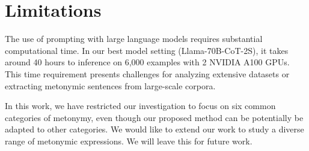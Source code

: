 \documentclass[11pt]{article}
\begin{document}
\begin{table}[t]
    \centering
\caption{Increase in F1-score on metonymic examples using majority vote. The values in parentheses indicate the increase in F1-score for metonymic examples compared to the single-run baseline.}
\label{table:ensemble_basic_cot}
\end{table}

\section*{Limitations}

The use of prompting with large language models requires substantial computational time. In our best model setting (Llama-70B-CoT-2S), it takes around 40 hours to inference on 6,000 examples with 2 NVIDIA A100 GPUs. This time requirement presents challenges for analyzing extensive datasets or extracting metonymic sentences from large-scale corpora.

In this work, we have restricted our investigation to focus on six common categories of metonymy, even though our proposed method can be potentially be adapted to other categories. We would like to extend our work to study a diverse range of metonymic expressions. We will leave this for future work.
\end{document}
